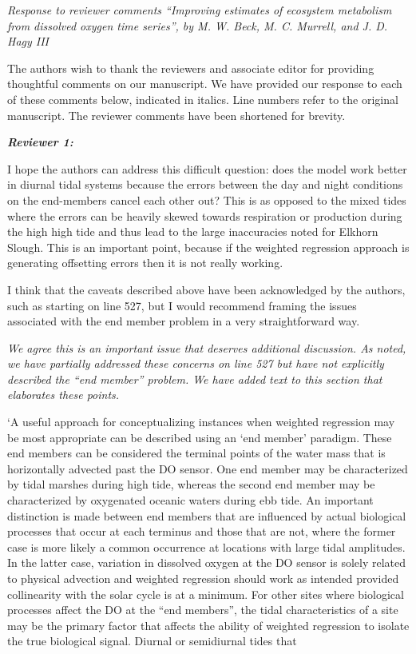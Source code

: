 \documentclass[letterpaper,12pt]{article}\usepackage[]{graphicx}\usepackage[]{color}
\newcommand{\Bigtxt}[1]{\textbf{\textit{#1}}}
\begin{document}
\raggedright


{\it Response to reviewer comments ``Improving estimates of ecosystem metabolism from dissolved oxygen time series'', by M. W. Beck, M. C. Murrell, and J. D. Hagy III}

The authors wish to thank the reviewers and associate editor for providing thoughtful comments on our manuscript.  We have provided our response to each of these comments below, indicated in italics.  Line numbers refer to the original manuscript. The reviewer comments have been shortened for brevity.

\Bigtxt{Reviewer 1:}

I hope the authors can address this difficult question: does the model work better in diurnal tidal systems because the errors between the day and night conditions on the end-members cancel each other out? This is as opposed to the mixed tides where the errors can be heavily skewed towards respiration or production during the high high tide and thus lead to the large inaccuracies noted for Elkhorn Slough. This is an important point, because if the weighted regression approach is generating offsetting errors then it is not really working.

I think that the caveats described above have been acknowledged by the authors, such as starting on line 527, but I would recommend framing the issues associated with the end member problem in a very straightforward way. 

{\it We agree this is an important issue that deserves additional discussion.  As noted, we have partially addressed these concerns on line 527 but have not explicitly described the ``end member'' problem.  We have added text to this section that elaborates these points. 

`A useful approach for conceptualizing instances when weighted regression may be most appropriate can be described using an `end member' paradigm.  These end members can be considered the terminal points of the water mass that is horizontally advected past the DO sensor.  One end member may be characterized by tidal marshes during high tide, whereas the second end member may be characterized by oxygenated oceanic waters during ebb tide.  An important distinction is made between end members that are influenced by actual biological processes that occur at each terminus and those that are not, where the former case is more likely a common occurrence at locations with large tidal amplitudes.  In the latter case, variation in dissolved oxygen at the DO sensor is solely related to physical advection and weighted regression should work as intended provided collinearity with the solar cycle is at a minimum.  For other sites where biological processes affect the DO at the ``end members'', the tidal characteristics of a site may be the primary factor that affects the ability of weighted regression to isolate the true biological signal.  Diurnal or semidiurnal tides that     
}
\end{document}
